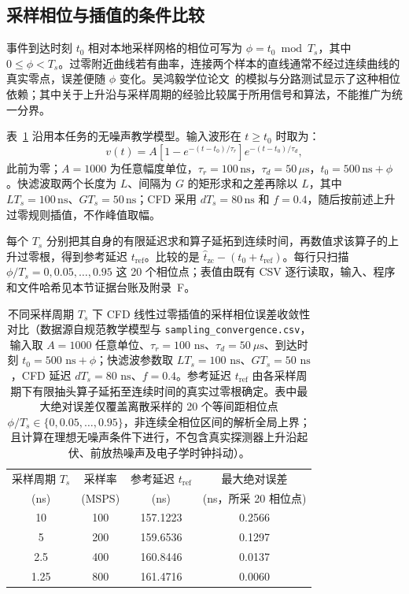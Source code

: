 \subsection{采样相位与插值的条件比较}\label{subsec:5-4-2}

事件到达时刻 $t_0$ 相对本地采样网格的相位可写为 $\phi = t_0 \bmod T_s$，其中 $0 \le \phi < T_s$。过零附近曲线若有曲率，连接两个样本的直线通常不经过连续曲线的真实零点，误差便随 $\phi$ 变化。吴鸿毅学位论文~\cite[第~92--96~页]{wu-hongyi-2020-general-purpose-digital-daq-thesis}的模拟与分路测试显示了这种相位依赖；其中关于上升沿与采样周期的经验比较属于所用信号和算法，不能推广为统一分界。

表~\ref{tab:5-4-sampling-convergence} 沿用本任务的无噪声教学模型。输入波形在 $t \ge t_0$ 时取为：
\begin{equation}\label{eq:5-4-input-pulse}
v(t) = A \left[1 - e^{-(t-t_0)/\tau_r}\right] e^{-(t-t_0)/\tau_d},
\end{equation}
此前为零；$A = 1000$ 为任意幅度单位，$\tau_r = 100\,\mathrm{ns}$，$\tau_d = 50\,\mu\mathrm{s}$，$t_0 = 500\,\mathrm{ns} + \phi$。快滤波取两个长度为 $L$、间隔为 $G$ 的矩形求和之差再除以 $L$，其中 $L T_s = 100\,\mathrm{ns}$、$G T_s = 50\,\mathrm{ns}$；CFD 采用 $d T_s = 80\,\mathrm{ns}$ 和 $f = 0.4$，随后按前述上升过零规则插值，不作峰值取幅。

每个 $T_s$ 分别把其自身的有限延迟求和算子延拓到连续时间，再数值求该算子的上升过零根，得到参考延迟 $t_{\mathrm{ref}}$。比较的是 $\widehat{t}_{\mathrm{zc}} - (t_0 + t_{\mathrm{ref}})$。每行只扫描 $\phi/T_s = 0, 0.05, \dots, 0.95$ 这 20 个相位点；表值由既有 CSV 逐行读取，输入、程序和文件哈希见本节证据台账及附录~F。

\begin{table}[!htbp]
\centering
\caption[不同采样周期 $T_s$ 下 CFD 线性过零插值的采样相位误差收敛性对比]{不同采样周期 $T_s$ 下 CFD 线性过零插值的采样相位误差收敛性对比（数据源自规范教学模型与 \texttt{sampling\_convergence.csv}，输入取 $A=1000$ 任意单位、$\tau_r = 100\text{ ns}$、$\tau_d = 50\ \mu\text{s}$、到达时刻 $t_0 = 500\text{ ns} + \phi$；快滤波参数取 $L T_s = 100\text{ ns}$、$G T_s = 50\text{ ns}$，CFD 延迟 $d T_s = 80\text{ ns}$、$f = 0.4$。参考延迟 $t_{\text{ref}}$ 由各采样周期下有限抽头算子延拓至连续时间的真实过零根确定。表中最大绝对误差仅覆盖离散采样的 20 个等间距相位点 $\phi/T_s \in \{0, 0.05, \dots, 0.95\}$，非连续全相位区间的解析全局上界；且计算在理想无噪声条件下进行，不包含真实探测器上升沿起伏、前放热噪声及电子学时钟抖动）。}
\label{tab:5-4-sampling-convergence}
\begin{tabular}{cccc}
\toprule
采样周期 $T_s$ & 采样率 & 参考延迟 $t_{\text{ref}}$ & 最大绝对误差 \\
(ns) & (MSPS) & (ns) & (ns，所采 20 相位点) \\
\midrule
10   & 100 & 157.1223 & 0.2566 \\
5    & 200 & 159.6536 & 0.1297 \\
2.5  & 400 & 160.8446 & 0.0137 \\
1.25 & 800 & 161.4716 & 0.0060 \\
\bottomrule
\end{tabular}
\end{table}

